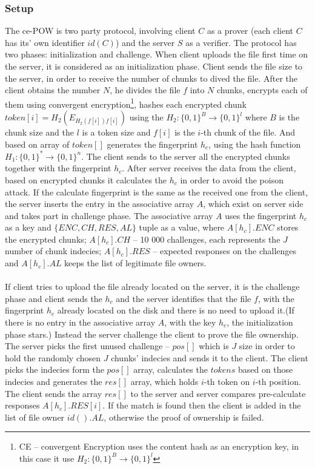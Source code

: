 \documentclass[12pt]{article}
\begin{document}
\subsubsection{Setup}
\label{subsub:setup7}
The ce-POW is two party protocol, involving client $C$ as a prover (each client $C$ has its' own identifier $id(C)$) and the server $S$ as a verifier. The protocol has two phases: initialization  and challenge. When client uploads the file first time on the server, it is considered as an initialization phase. Client sends the file size to the server, in order to receive the number of chunks to dived the file. After the client obtains the number $N$, he divides the file $f$ into $N$ chunks, encrypts each of them using convergent encryption\footnote{CE -- convergent Encryption uses the content hash as an encryption key, in this case it use $H_2:\{0,1\}^B\rightarrow\{0,1\}^l$}, hashes each encrypted chunk $token[i]=H_2(E_{H_2(f[i])f[i]})$ using the $H_2:\{0,1\}^B\rightarrow\{0,1\}^l$ where $B$ is the chunk size and the $l$ is a token size and $f[i]$ is the $i$-th chunk of the file. And based on array of $token[]$ generates the fingerprint $h_c$, using the hash function $H_1:\{0,1\}^*\rightarrow\{0,1\}^n$. The client sends to the server all the encrypted chunks together with the fingerprint $h_c$. After server receives the data from the client, based on encrypted chunks it calculates the $h_c$ in order to avoid the poison attack. If the calculate fingerprint is the same as the received one from the client, the server inserts the entry in the associative array $A$, which exist on server side and takes part in challenge phase.  The  associative array $A$ uses the fingerprint $h_c$ as a key and  $\{ENC, CH, RES, AL\}$ tuple as a value, where $A[h_c].ENC$ stores the encrypted chunks; $A[h_c].CH$ -- 10 000 challenges, each represents the $J$ number of chunk indecies; $A[h_c].RES$ -- expected responses on the challenges and   $A[h_c].AL$ keeps the list of legitimate file owners.\\\\
If client tries to upload the file already located on the server, it is the challenge phase and client sends the $h_c$ and the server identifies that the file $f$, with the fingerprint $h_c$ already located on the disk and there is no need to upload it.(If there is no entry in the associative array $A$, with the key $h_c$, the initialization phase stars.) Instead the server challenge the client to prove the file ownership. The server picks the first unused challenge --  $pos[]$ which is $J$ size in order to hold the randomly chosen $J$ chunks' indecies and sends it to the client. The client picks the indecies form the $pos[]$  array, calculates the $tokens$ based on those indecies and generates the $res[]$ array, which holds $i$-th token on $i$-th  position. The client sends the array $res[]$ to the server and server compares  pre-calculate responses  $A[h_c].RES[i]$. If the match is found then the client is added in the list of file owner $id().AL$, otherwise the proof of ownership is failed.
\end{document}
